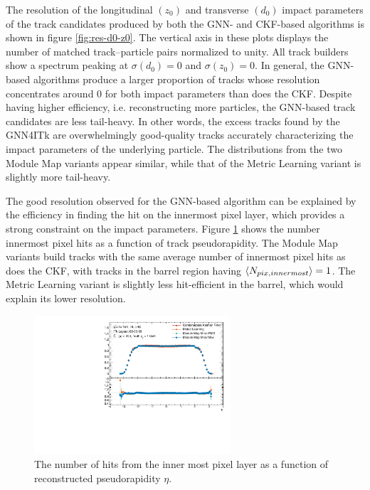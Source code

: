 The resolution of the longitudinal $(z_0)$ and transverse $(d_0)$ impact parameters of the track candidates produced by both the GNN- and CKF-based algorithms is shown in figure \ref{fig:res-d0-z0}. 
The vertical axis in these plots displays the number of matched track--particle pairs normalized to unity. 
All track builders show a spectrum peaking at $\sigma(d_0) = 0$ and $\sigma(z_0)=0$. 
In general, the GNN-based algorithms produce a larger proportion of tracks whose resolution concentrates around 0 for both impact parameters than does the CKF.
Despite having higher efficiency, i.e. reconstructing more particles, the GNN-based track candidates are less tail-heavy.
In other words, the excess tracks found by the GNN4ITk are overwhelmingly good-quality tracks accurately characterizing the impact parameters of the underlying particle.
The distributions from the two Module Map variants appear similar, while that of the Metric Learning variant is slightly more tail-heavy. 

The good resolution observed for the GNN-based algorithm can be explained by the efficiency in finding the hit on the innermost pixel layer, which provides a strong constraint on the impact parameters. 
Figure \ref{fig:n-innermost-pix} shows the number innermost pixel hits as a function of track pseudorapidity.
The Module Map variants build tracks with the same average number of innermost pixel hits as does the CKF, with tracks in the barrel region having $\expval{N_{pix,innermost}}=1$.
The Metric Learning variant is slightly less hit-efficient in the barrel, which would explain its lower resolution.

\begin{figure}[h!]
    \centering
    \includegraphics[width=0.65\textwidth]{figures/ckf-gnn/HitsOnTracks/nInnerMostPixelHits_vs_eta.pdf}
    \caption{The number of hits from the inner most pixel layer as a function of reconstructed pseudorapidity $\eta$.}
    \label{fig:n-innermost-pix}
\end{figure}

